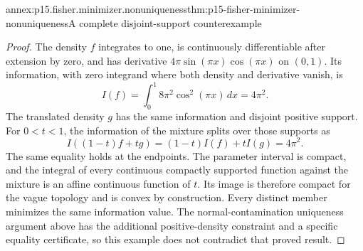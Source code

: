 \begin{annexitem}{annex:p15.fisher.minimizer.nonuniqueness}{thm:p15-fisher-minimizer-nonuniqueness}{A complete disjoint-support counterexample}
\begin{proof}
The density \(f\) integrates to one, is continuously differentiable
after extension by zero, and has derivative
\(4\pi\sin(\pi x)\cos(\pi x)\) on \((0,1)\).
Its information, with zero integrand where both density and derivative
vanish, is
\[
 I(f)=\int_0^1 8\pi^2\cos^2(\pi x)\,dx=4\pi^2.
\]
The translated density \(g\) has the same information and disjoint
positive support. For \(0<t<1\), the information of the mixture
splits over those supports as
\[
 I((1-t)f+tg)=(1-t)I(f)+tI(g)=4\pi^2.
\]
The same equality holds at the endpoints.
The parameter interval is compact, and the integral of every
continuous compactly supported function against the mixture is
an affine continuous function of \(t\). Its image is therefore
compact for the vague topology and is convex by construction.
Every distinct member minimizes the same information value.
The normal-contamination uniqueness argument above has the additional
positive-density constraint and a specific equality certificate,
so this example does not contradict that proved result.
\end{proof}
\end{annexitem}
